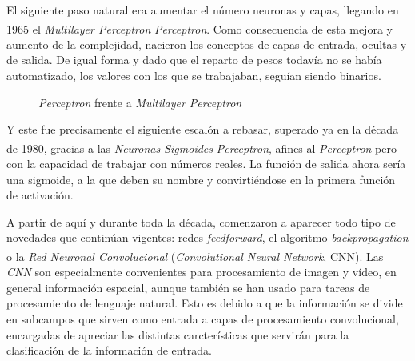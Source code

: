 El siguiente paso natural era aumentar el número neuronas y capas,
llegando en 1965 el \textit{Multilayer Perceptron}
\textit{Perceptron}\textsuperscript{\cite{mlperceptron}}. Como consecuencia
de esta mejora y aumento de la complejidad, nacieron los conceptos de
capas de entrada, ocultas y de salida. De igual forma y dado que el
reparto de pesos todavía no se había automatizado, los valores con los
que se trabajaban, seguían siendo binarios.

\begin{figure}[h]
    \centering
    \hfill
    \caption{\textit{Perceptron} frente a \textit{Multilayer Perceptron}}
  \end{figure}


Y este fue precisamente el siguiente escalón a rebasar, superado ya en
la década de 1980, gracias a las \textit{Neuronas Sigmoides}
\textit{Perceptron}\textsuperscript{\cite{sancho}}, afines al
\textit{Perceptron} pero con la capacidad de trabajar con números reales.
La función de salida ahora sería una sigmoide, a la que deben su nombre y
convirtiéndose en la primera función de activación.

A partir de aquí y durante toda la década, comenzaron a aparecer todo tipo
de novedades que continúan vigentes: redes \textit{feedforward}, el algoritmo
\textit{backpropagation} o la \textit{Red Neuronal Convolucional}
(\textit{Convolutional Neural Network}, CNN)\textsuperscript{\cite{geo}}.
Las \textit{CNN} son especialmente convenientes para procesamiento de
imagen y vídeo, en general información espacial, aunque también se han
usado para tareas de procesamiento
de lenguaje natural. Esto es debido a que la información se divide en subcampos que sirven como
entrada a capas de procesamiento convolucional, encargadas de apreciar
las distintas carcterísticas que servirán para la clasificación de la
información de entrada.

